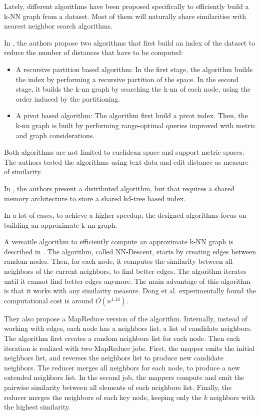 \documentclass[wcp]{jmlr}
\begin{document}
Lately, different algorithms have been proposed specifically to efficiently build a k-NN graph from a dataset. Most of them will naturally share similarities with nearest neighbor search algorithms.

In \cite{Paredes2006}, the authors propose two algorithms that first build an index of the dataset to reduce the number of distances that have to be computed:

\begin{itemize}
	\item A recursive partition based algorithm: In the first stage, the algorithm builds the index by performing a recursive partition of the space. In the second stage, it builds the k-nn graph by searching the k-nn of each node, using the order induced by the partitioning.
	\item A pivot based algorithm: The algorithm first build a pivot index. Then, the k-nn graph is built by performing range-optimal queries improved with metric and graph considerations.
\end{itemize}

Both algorithms are not limited to euclidean space and support metric spaces. The authors tested the algorithms using text data and edit distance as measure of similarity.

In \cite{Connor2009}, the authors present a distributed algorithm, but that requires a shared memory architecture to store a shared kd-tree based index.

In a lot of cases, to achieve a higher speedup, the designed algorithms focus on building an approximate k-nn graph.

A versatile algorithm to efficiently compute an approximate k-NN graph is described in \cite{Dong2011}. The algorithm, called NN-Descent, starts by creating edges between random nodes. Then, for each node, it computes the similarity between all neighbors of the current neighbors, to find better edges. The algorithm iterates until it cannot find better edges anymore. The main advantage of this algorithm is that it works with any similarity measure. Dong et al. experimentally found the computational cost is around $O(n^{1.14})$.

They also propose a MapReduce version of the algorithm. Internally, instead of working with edges, each node has a neighbors list, a list of candidate neighbors. The algorithm first creates a random neighbors list for each node. Then each iteration is realized with two MapReduce jobs. First, the mapper emits the initial neighbors list, and reverses the neighbors list to produce new candidate neighbors. The reducer merges all neighbors for each node, to produce a new extended neighbors list. In the second job, the mappers compute and emit the pairwise similarity between all elements of each neighbors list. Finally, the reducer merges the neighbors of each key node, keeping only the $k$ neighbors with the highest similarity.
\end{document}
